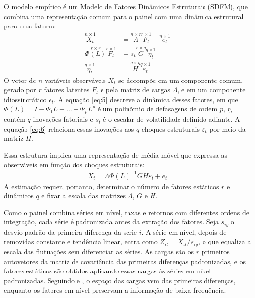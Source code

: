 \documentclass[preprint,authoryear,review,12pt]{elsarticle}
\begin{document}
O modelo empírico é um Modelo de Fatores Dinâmicos Estruturais (SDFM), que combina uma representação comum para o painel com uma dinâmica estrutural para seus fatores:
\begin{align}
    \overset{n\times 1}{X_t} &= \overset{n\times r}{\Lambda} \overset{r\times 1}{F_t} + \overset{n\times 1}{e_t}\label{eq:4}\\[4pt]
    \overset{r\times r}{\Phi(L)}\overset{r\times 1}{F_t} &= s_t \overset{r\times q}{G} \overset{q\times 1}{\eta_t} \label{eq:5}\\[4pt]
    \overset{q\times 1}{\eta_t} &= \overset{q\times q}{H} \overset{q\times 1}{\varepsilon_t} \label{eq:6}
\end{align}
O vetor de $n$ variáveis observáveis $X_t$ se decompõe em um componente comum, gerado por $r$ fatores latentes $F_t$ e pela matriz de cargas $\Lambda$, e em um componente idiossincrático $e_t$. A equação \ref{eq:5} descreve a dinâmica desses fatores, em que $\Phi(L) = I - \Phi_1 L - \dots - \Phi_p L^p$ é um polinômio de defasagens de ordem $p$, $\eta_t$ contém $q$ inovações fatoriais e $s_t$ é o escalar de volatilidade definido adiante. A equação \ref{eq:6} relaciona essas inovações aos $q$ choques estruturais $\varepsilon_t$ por meio da matriz $H$.

Essa estrutura implica uma representação de média móvel que expressa as observáveis em função dos choques estruturais:
\begin{align}\label{eq:7}
    X_t=\Lambda \Phi(L)^{-1}GH\varepsilon_t + e_t
\end{align}
A estimação requer, portanto, determinar o número de fatores estáticos $r$ e dinâmicos $q$ e fixar a escala das matrizes $\Lambda$, $G$ e $H$.


Como o painel combina séries em nível, taxas e retornos com diferentes ordens de integração, cada série é padronizada antes da extração dos fatores. Seja $s_{iy}$ o desvio padrão da primeira diferença da série $i$. A série em nível, depois de removidas constante e tendência linear, entra como $Z_{it} = X_{it}/s_{iy}$, o que equaliza a escala das flutuações sem diferenciar as séries. As cargas são os $r$ primeiros autovetores da matriz de covariância das primeiras diferenças padronizadas, e os fatores estáticos são obtidos aplicando essas cargas às séries em nível padronizadas. Seguindo \cite{alessi} e \cite{barigozzi2016non}, o espaço das cargas vem das primeiras diferenças, enquanto os fatores em nível preservam a informação de baixa frequência.
\end{document}
